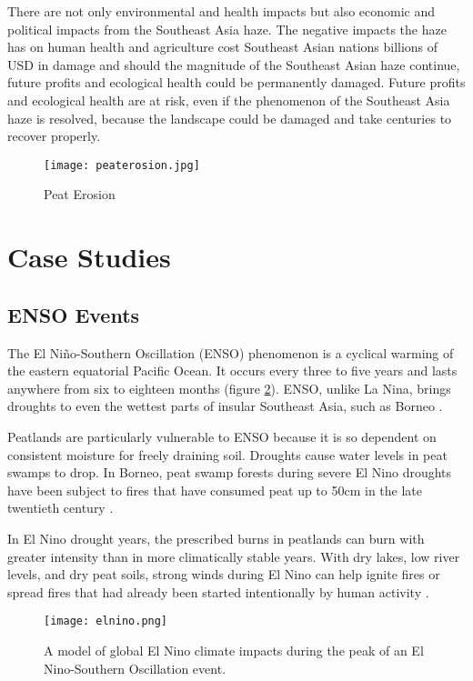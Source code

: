 There are not only environmental and health impacts but also economic and political impacts from the Southeast Asia haze. The negative impacts the haze has on human health and agriculture cost Southeast Asian nations billions of USD in damage and should the magnitude of the Southeast Asian haze continue, future profits and ecological health could be permanently damaged. Future profits and ecological health are at risk, even if the phenomenon of the Southeast Asia haze is resolved, because the landscape could be damaged and take centuries to recover properly.

\begin{figure}
  \texttt{[image: peaterosion.jpg]}
  \caption{Peat Erosion}
  \label{fig:peaterosion}
\end{figure}

\section{Case Studies}

\subsection{ENSO Events}

The El Ni\~{n}o-Southern Oscillation (ENSO) phenomenon is a cyclical warming of the eastern equatorial Pacific Ocean. It occurs every three to five years and lasts anywhere from six to eighteen months (figure \ref{fig:elnino}). ENSO, unlike La Nina, brings droughts to even the wettest parts of insular Southeast Asia, such as Borneo \citep{aiken2004runaway}.

Peatlands are particularly vulnerable to ENSO because it is so dependent on consistent moisture for freely draining soil. Droughts cause water levels in peat swamps to drop. In Borneo, peat swamp forests during severe El Nino droughts have been subject to fires that have consumed peat up to 50cm in the late twentieth century \citep{turetsky2015global}.

In El Nino drought years, the prescribed burns in peatlands can burn with greater intensity than in more climatically stable years. With dry lakes, low river levels, and dry peat soils, strong winds during El Nino can help ignite fires or spread fires that had already been started intentionally by human activity \citep{chokkalingam2005fire}.  

\begin{figure}
  \texttt{[image: elnino.png]}
  \caption{A model of global El Nino climate impacts during the peak of an El Nino-Southern Oscillation event.}
  \label{fig:elnino}
\end{figure}


